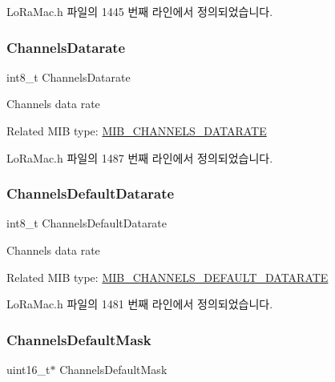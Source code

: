 Lo\+Ra\+Mac.\+h 파일의 1445 번째 라인에서 정의되었습니다.

\mbox{\label{unionu_mib_param_a6c741587260d08d1b883922ce9ca345e}} 
\subsubsection{\texorpdfstring{Channels\+Datarate}{ChannelsDatarate}}
{\footnotesize\ttfamily int8\+\_\+t Channels\+Datarate}

Channels data rate

Related M\+IB type\+: \mbox{\hyperlink{group___l_o_r_a_m_a_c_gga32ea83d13a3f5bb4b3ec2ace2319ab61a78f3b4e3ae4ebaacb478073d2a2ec4f1}{M\+I\+B\+\_\+\+C\+H\+A\+N\+N\+E\+L\+S\+\_\+\+D\+A\+T\+A\+R\+A\+TE}} 

Lo\+Ra\+Mac.\+h 파일의 1487 번째 라인에서 정의되었습니다.

\mbox{\label{unionu_mib_param_a69f274bb7ff03f12dbda701c3576ac62}} 
\subsubsection{\texorpdfstring{Channels\+Default\+Datarate}{ChannelsDefaultDatarate}}
{\footnotesize\ttfamily int8\+\_\+t Channels\+Default\+Datarate}

Channels data rate

Related M\+IB type\+: \mbox{\hyperlink{group___l_o_r_a_m_a_c_gga32ea83d13a3f5bb4b3ec2ace2319ab61addef34adbf844ace9eeea97ae93da918}{M\+I\+B\+\_\+\+C\+H\+A\+N\+N\+E\+L\+S\+\_\+\+D\+E\+F\+A\+U\+L\+T\+\_\+\+D\+A\+T\+A\+R\+A\+TE}} 

Lo\+Ra\+Mac.\+h 파일의 1481 번째 라인에서 정의되었습니다.

\mbox{\label{unionu_mib_param_ac22764d7ec77150f51f49a3c8839f161}} 
\subsubsection{\texorpdfstring{Channels\+Default\+Mask}{ChannelsDefaultMask}}
{\footnotesize\ttfamily uint16\+\_\+t$\ast$ Channels\+Default\+Mask}


